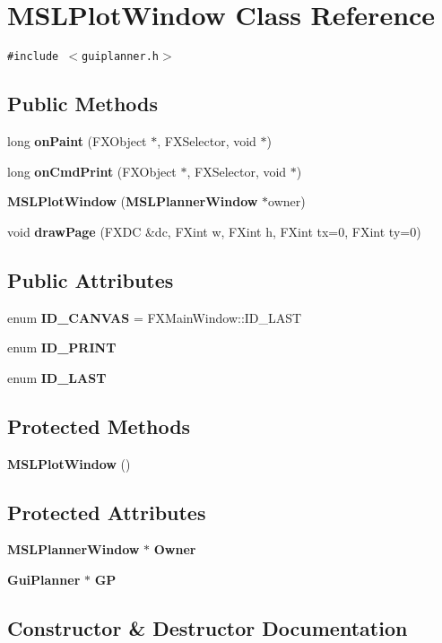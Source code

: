 \section{MSLPlot\-Window  Class Reference}
\label{classMSLPlotWindow}
{\tt \#include $<$guiplanner.h$>$}

\subsection*{Public Methods}
\begin{CompactItemize}
\item 
long {\bf on\-Paint} (FXObject $\ast$, FXSelector, void $\ast$)
\item 
long {\bf on\-Cmd\-Print} (FXObject $\ast$, FXSelector, void $\ast$)
\item 
{\bf MSLPlot\-Window} ({\bf MSLPlanner\-Window} $\ast$owner)
\item 
void {\bf draw\-Page} (FXDC \&dc, FXint w, FXint h, FXint tx=0, FXint ty=0)
\end{CompactItemize}
\subsection*{Public Attributes}
\begin{CompactItemize}
\item 
enum {\bf ID\_\-CANVAS} = FXMain\-Window::ID\_\-LAST
\item 
enum {\bf ID\_\-PRINT}
\item 
enum {\bf ID\_\-LAST}
\end{CompactItemize}
\subsection*{Protected Methods}
\begin{CompactItemize}
\item 
{\bf MSLPlot\-Window} ()
\end{CompactItemize}
\subsection*{Protected Attributes}
\begin{CompactItemize}
\item 
{\bf MSLPlanner\-Window} $\ast$ {\bf Owner}
\item 
{\bf Gui\-Planner} $\ast$ {\bf GP}
\end{CompactItemize}


\subsection{Constructor \& Destructor Documentation}
